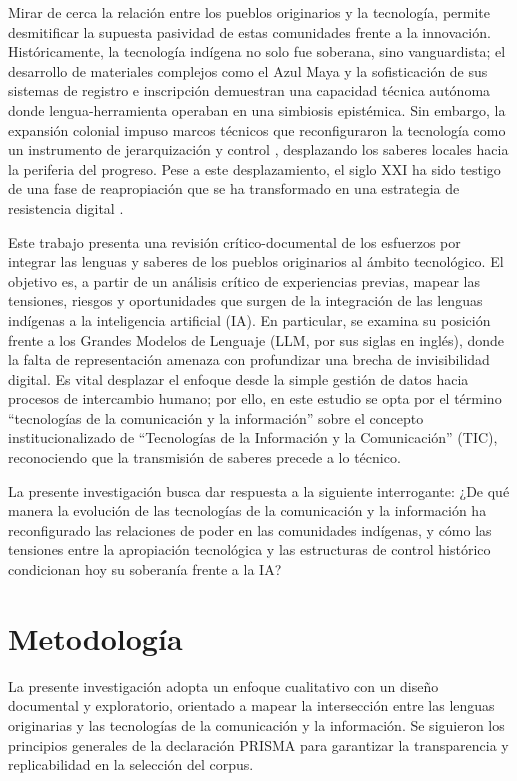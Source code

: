 \documentclass[spanish]{textolivre}
\begin{document}
Mirar de cerca la relación entre los pueblos originarios y la tecnología, permite desmitificar la supuesta pasividad de estas comunidades frente a la innovación. Históricamente, la tecnología indígena no solo fue soberana, sino vanguardista; el desarrollo de materiales complejos como el Azul Maya \cite{FernandezSabido2012,Yacaman1996} y la sofisticación de sus sistemas de registro e inscripción \cite{Klein2001,Lenoir1998} demuestran una capacidad técnica autónoma donde lengua-herramienta operaban en una simbiosis epistémica. Sin embargo, la expansión colonial impuso marcos técnicos que reconfiguraron la tecnología como un instrumento de jerarquización y control \cite{Day2006,MallenRivera2012}, desplazando los saberes locales hacia la periferia del progreso. Pese a este desplazamiento, el siglo XXI ha sido testigo de una fase de reapropiación que se ha transformado en una estrategia de resistencia digital \cite{Dyson2016,Francese2023}.

Este trabajo presenta una revisión crítico-documental de los esfuerzos por integrar las lenguas y saberes de los pueblos originarios al ámbito tecnológico. El objetivo es, a partir de un análisis crítico de experiencias previas, mapear las tensiones, riesgos y oportunidades que surgen de la integración de las lenguas indígenas a la inteligencia artificial (IA). En particular, se examina su posición frente a los Grandes Modelos de Lenguaje (LLM, por sus siglas en inglés), donde la falta de representación amenaza con profundizar una brecha de invisibilidad digital. Es vital desplazar el enfoque desde la simple gestión de datos hacia procesos de intercambio humano; por ello, en este estudio se opta por el término “tecnologías de la comunicación y la información” sobre el concepto institucionalizado de “Tecnologías de la Información y la Comunicación” (TIC), reconociendo que la transmisión de saberes precede a lo técnico.

La presente investigación busca dar respuesta a la siguiente interrogante: ¿De qué manera la evolución de las tecnologías de la comunicación y la información ha reconfigurado las relaciones de poder en las comunidades indígenas, y cómo las tensiones entre la apropiación tecnológica y las estructuras de control histórico condicionan hoy su soberanía frente a la IA?

\section{Metodología}

La presente investigación adopta un enfoque cualitativo con un diseño documental y exploratorio, orientado a mapear la intersección entre las lenguas originarias y las tecnologías de la comunicación y la información. Se siguieron los principios generales de la declaración PRISMA para garantizar la transparencia y replicabilidad en la selección del corpus.
\end{document}
